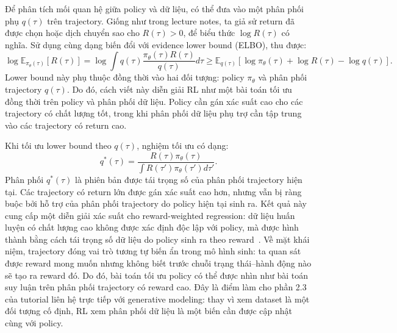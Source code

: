 Để phân tích mối quan hệ giữa policy và dữ liệu, có thể đưa vào một phân phối phụ $q(\tau)$ trên trajectory.
Giống như trong lecture notes, ta giả sử return đã được chọn hoặc dịch chuyển sao cho $R(\tau)>0$, để biểu thức $\log R(\tau)$ có nghĩa.
Sử dụng cùng dạng biến đổi với evidence lower bound (ELBO), thu được:
\begin{equation}
    \log \mathbb{E}_{\pi_\theta(\tau)}[R(\tau)]
    =
    \log
    \int
    q(\tau)
    \frac{\pi_\theta(\tau)R(\tau)}{q(\tau)}
    d\tau
    \geq
    \mathbb{E}_{q(\tau)}
    \left[
        \log \pi_\theta(\tau)
        +
        \log R(\tau)
        -
        \log q(\tau)
    \right].
\end{equation}
Lower bound này phụ thuộc đồng thời vào hai đối tượng: policy $\pi_\theta$ và phân phối trajectory $q(\tau)$.
Do đó, cách viết này diễn giải RL như một bài toán tối ưu đồng thời trên policy và phân phối dữ liệu.
Policy cần gán xác suất cao cho các trajectory có chất lượng tốt, trong khi phân phối dữ liệu phụ trợ cần tập trung vào các trajectory có return cao.

Khi tối ưu lower bound theo $q(\tau)$, nghiệm tối ưu có dạng:
\begin{equation}
    q^*(\tau)
    =
    \frac{R(\tau)\pi_\theta(\tau)}
    {\int R(\tau')\pi_\theta(\tau')d\tau'}.
\end{equation}
Phân phối $q^*(\tau)$ là phiên bản được tái trọng số của phân phối trajectory hiện tại.
Các trajectory có return lớn được gán xác suất cao hơn, nhưng vẫn bị ràng buộc bởi hỗ trợ của phân phối trajectory do policy hiện tại sinh ra.
Kết quả này cung cấp một diễn giải xác suất cho reward-weighted regression: dữ liệu huấn luyện có chất lượng cao không được xác định độc lập với policy, mà được hình thành bằng cách tái trọng số dữ liệu do policy sinh ra theo reward~\citep{peters2007rwr}.
Về mặt khái niệm, trajectory đóng vai trò tương tự biến ẩn trong mô hình sinh: ta quan sát được reward mong muốn nhưng không biết trước chuỗi trạng thái--hành động nào sẽ tạo ra reward đó.
Do đó, bài toán tối ưu policy có thể được nhìn như bài toán suy luận trên phân phối trajectory có reward cao.
Đây là điểm làm cho phần 2.3 của tutorial liên hệ trực tiếp với generative modeling: thay vì xem dataset là một đối tượng cố định, RL xem phân phối dữ liệu là một biến cần được cập nhật cùng với policy.

